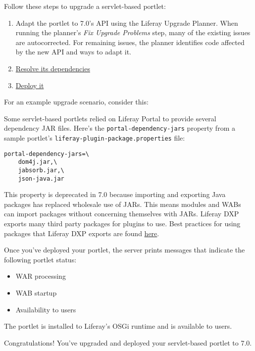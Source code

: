 Follow these steps to upgrade a servlet-based portlet:

\begin{enumerate}
\def\labelenumi{\arabic{enumi}.}
\item
  Adapt the portlet to 7.0's API using the Liferay Upgrade Planner. When
  running the planner's \emph{Fix Upgrade Problems} step, many of the
  existing issues are autocorrected. For remaining issues, the planner
  identifies code affected by the new API and ways to adapt it.
\item
  \href{/docs/7-2/tutorials/-/knowledge_base/t/resolving-a-projects-dependencies}{Resolve
  its dependencies}
\item
  \href{/docs/7-2/reference/-/knowledge_base/r/deploying-a-project}{Deploy
  it}
\end{enumerate}

For an example upgrade scenario, consider this:

Some servlet-based portlets relied on Liferay Portal to provide several
dependency JAR files. Here's the \texttt{portal-dependency-jars}
property from a sample portlet's
\texttt{liferay-plugin-package.properties} file:

\begin{verbatim}
portal-dependency-jars=\
    dom4j.jar,\
    jabsorb.jar,\
    json-java.jar
\end{verbatim}

This property is deprecated in 7.0 because importing and exporting Java
packages has replaced wholesale use of JARs. This means modules and WABs
can import packages without concerning themselves with JARs. Liferay DXP
exports many third party packages for plugins to use. Best practices for
using packages that Liferay DXP exports are found
\href{/docs/7-2/customization/-/knowledge_base/c/configuring-dependencies}{here}.

Once you've deployed your portlet, the server prints messages that
indicate the following portlet status:

\begin{itemize}
\tightlist
\item
  WAR processing
\item
  WAB startup
\item
  Availability to users
\end{itemize}

The portlet is installed to Liferay's OSGi runtime and is available to
users.

Congratulations! You've upgraded and deployed your servlet-based portlet
to 7.0.

